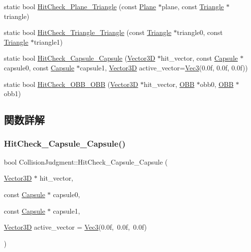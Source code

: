 \begin{DoxyCompactItemize}
static bool \mbox{\hyperlink{class_collision_judgment_a473c94087dc9cd3937016ccba5f12abd}{Hit\+Check\+\_\+\+Plane\+\_\+\+Triangle}} (const \mbox{\hyperlink{class_plane}{Plane}} $\ast$plane, const \mbox{\hyperlink{class_triangle}{Triangle}} $\ast$triangle)
\item 
static bool \mbox{\hyperlink{class_collision_judgment_ab33b8936e62bdb9b6cf6f3d383c033b9}{Hit\+Check\+\_\+\+Triangle\+\_\+\+Triangle}} (const \mbox{\hyperlink{class_triangle}{Triangle}} $\ast$triangle0, const \mbox{\hyperlink{class_triangle}{Triangle}} $\ast$triangle1)
\item 
static bool \mbox{\hyperlink{class_collision_judgment_a95962556f370a964ec1961b1c461ae2a}{Hit\+Check\+\_\+\+Capsule\+\_\+\+Capsule}} (\mbox{\hyperlink{class_vector3_d}{Vector3D}} $\ast$hit\+\_\+vector, const \mbox{\hyperlink{class_capsule}{Capsule}} $\ast$capsule0, const \mbox{\hyperlink{class_capsule}{Capsule}} $\ast$capsule1, \mbox{\hyperlink{class_vector3_d}{Vector3D}} active\+\_\+vector=\mbox{\hyperlink{_vector3_d_8h_ab16f59e4393f29a01ec8b9bbbabbe65d}{Vec3}}(0.\+0f, 0.\+0f, 0.\+0f))
\item 
static bool \mbox{\hyperlink{class_collision_judgment_a3c0a99feef4531370096d458aefa8941}{Hit\+Check\+\_\+\+O\+B\+B\+\_\+\+O\+BB}} (\mbox{\hyperlink{class_vector3_d}{Vector3D}} $\ast$hit\+\_\+vector, \mbox{\hyperlink{class_o_b_b}{O\+BB}} $\ast$obb0, \mbox{\hyperlink{class_o_b_b}{O\+BB}} $\ast$obb1)
\end{DoxyCompactItemize}


\subsection{関数詳解}
\mbox{\label{class_collision_judgment_a95962556f370a964ec1961b1c461ae2a}} 
\subsubsection{\texorpdfstring{Hit\+Check\+\_\+\+Capsule\+\_\+\+Capsule()}{HitCheck\_Capsule\_Capsule()}}
{\footnotesize\ttfamily bool Collision\+Judgment\+::\+Hit\+Check\+\_\+\+Capsule\+\_\+\+Capsule (\begin{DoxyParamCaption}\item[{\mbox{\hyperlink{class_vector3_d}{Vector3D}} $\ast$}]{hit\+\_\+vector,  }\item[{const \mbox{\hyperlink{class_capsule}{Capsule}} $\ast$}]{capsule0,  }\item[{const \mbox{\hyperlink{class_capsule}{Capsule}} $\ast$}]{capsule1,  }\item[{\mbox{\hyperlink{class_vector3_d}{Vector3D}}}]{active\+\_\+vector = {\ttfamily \mbox{\hyperlink{_vector3_d_8h_ab16f59e4393f29a01ec8b9bbbabbe65d}{Vec3}}(0.0f,~0.0f,~0.0f)} }\end{DoxyParamCaption})\hspace{0.3cm}{\ttfamily [static]}}

